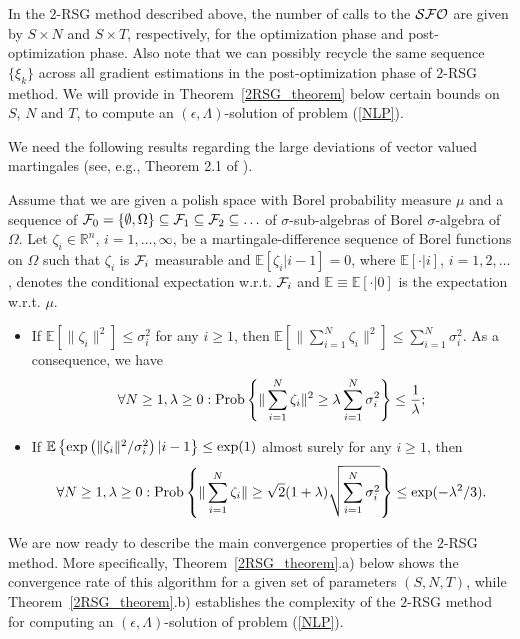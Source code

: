 \documentclass[final]{siamltex}
\def\eqnok#1{(\ref{#1})}
\def\vgap{\vspace*{.1in}}
\def\exp{{\rm exp}}
\def\prob{{\rm Prob}}
\newcommand{\bbe}{\mathbb{E}}
\def\prob{\mathop{\rm Prob}}
\newcommand{\bbr}{\mathbb{R}}
\def\SFO{{\cal SFO}}
\begin{document}
In the $2$-RSG method described above, the number of calls
to the $\SFO$ are given by $S \times N$ and $S \times T$,
respectively, for the optimization phase and post-optimization phase.
Also note that we can possibly recycle the same sequence $\{\xi_k\}$ across
all gradient estimations in the post-optimization phase of $2$-RSG method.
We will provide in Theorem~\ref{2RSG_theorem} below certain bounds on $S$, $N$ and $T$,
to compute an $(\epsilon, \Lambda)$-solution of problem \eqnok{NLP}.

We need the following results regarding the large deviations of
vector valued martingales (see, e.g., Theorem 2.1 of \cite{jn08-1}).

\begin{lemma} \label{marting}
Assume that we are given a polish space with Borel probability measure $\mu$ and
a sequence of ${\cal F}_0 = \{\emptyset,\Omega\} \subseteq {\cal F}_1
\subseteq {\cal F}_2 \subseteq \ldots$ of $\sigma$-sub-algebras of Borel
$\sigma$-algebra of $\Omega$.
Let $\zeta_i \in \bbr^n$, $i = 1, \ldots, \infty$, be a martingale-difference sequence
of Borel functions on $\Omega$ such that $\zeta_i$ is ${\cal F}_i$  measurable and
$\bbe[\zeta_i| i-1] =0$, where $\bbe[\cdot|i]$, $i = 1, 2, \ldots$, denotes the
conditional expectation w.r.t. ${\cal F}_i$ and $\bbe \equiv \bbe[\cdot|0]$ is the expectation w.r.t.
$\mu$.
\begin{itemize}
\item [a)] If $\bbe[\|\zeta_i\|^2] \le \sigma_i^2$ for any $i \ge 1$, then
$
\bbe[\|\sum_{i=1}^N \zeta_i\|^2] \le \sum_{i=1}^N \sigma_i^2$. As a consequence, we have
\[
\forall N \ge 1, \lambda \ge 0: \prob\left\{
\|\sum_{i=1}^N \zeta_i \|^2 \ge \lambda \sum_{i=1}^N \sigma_i^2
\right\} \le \frac{1}{\lambda};
\]
\item [b)] If $\bbe\left\{\exp\left(
\|\zeta_i\|^2 /\sigma_i^{2}  \right)|i-1 \right\} \le \exp(1)$ almost surely for any $i \ge 1$, then
\[
\forall N \ge 1, \lambda \ge 0: \prob\left\{
\|\sum_{i=1}^N \zeta_i \| \ge \sqrt{2} (1+ \lambda) \sqrt{\sum_{i=1}^N \sigma_i^2}
\right\} \le \exp(-\lambda^2 /3).
\]
\end{itemize}
\end{lemma}

\vgap

We are now ready to describe the main convergence properties of the $2$-RSG method.
More specifically, Theorem~\ref{2RSG_theorem}.a) below shows the convergence
rate of this algorithm for a given set of parameters $(S,N,T)$, while Theorem~\ref{2RSG_theorem}.b)
establishes the complexity of the $2$-RSG method for computing an
$(\epsilon, \Lambda)$-solution of problem \eqnok{NLP}.
\end{document}
